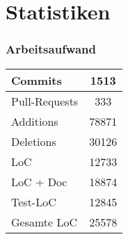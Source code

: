 \section{Statistiken}

\begin{frame}\frametitle{Arbeitsaufwand}
    \centering
    \begin{minipage}{\textwidth}
        \begin{minipage}{.39\textwidth}
            \centering
            \begin{tabular}{l|c}
                Commits & 1513 \\
                \hline
                Pull-Requests & 333 \\
                \hline
                Additions & 78871\\
                \hline
                Deletions & 30126 \\
                \hline
                LoC & 12733 \\
                \hline
                LoC + Doc & 18874 \\
                \hline
                Test-LoC & 12845 \\
                \hline
                \hline
                Gesamte LoC & 25578
            \end{tabular}
        \end{minipage}
        \begin{minipage}{.60\textwidth}
            \centering
        \end{minipage}
    \end{minipage}
\end{frame}
